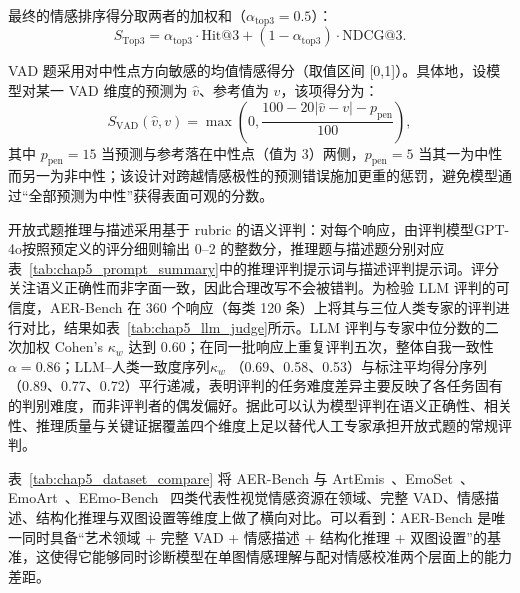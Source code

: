 最终的情感排序得分取两者的加权和（$\alpha_{\text{top3}}=0.5$）：
\begin{equation}
S_{\text{Top3}}=\alpha_{\text{top3}}\cdot\mathrm{Hit@3}+(1-\alpha_{\text{top3}})\cdot\mathrm{NDCG@3}.
\label{eq:chap5_stop3}
\end{equation}

VAD 题采用对中性点方向敏感的均值情感得分（取值区间 [0,1]）。具体地，设模型对某一 VAD 维度的预测为 $\hat{v}$、参考值为 $v$，该项得分为：
\begin{equation}
S_{\text{VAD}}(\hat{v},v)=\max\left(0,\frac{100-20|\hat{v}-v|-p_{\text{pen}}}{100}\right),
\label{eq:chap5_svad}
\end{equation}
其中 $p_{\text{pen}}=15$ 当预测与参考落在中性点（值为 3）两侧，$p_{\text{pen}}=5$ 当其一为中性而另一为非中性；该设计对跨越情感极性的预测错误施加更重的惩罚，避免模型通过“全部预测为中性”获得表面可观的分数。

开放式题推理与描述采用基于 rubric 的语义评判：对每个响应，由评判模型GPT-4o按照预定义的评分细则输出 0--2 的整数分，推理题与描述题分别对应表~\ref{tab:chap5_prompt_summary}中的推理评判提示词与描述评判提示词。评分关注语义正确性而非字面一致，因此合理改写不会被错判。为检验 LLM 评判的可信度，AER-Bench 在 360 个响应（每类 120 条）上将其与三位人类专家的评判进行对比，结果如表~\ref{tab:chap5_llm_judge}所示。LLM 评判与专家中位分数的二次加权 Cohen's $\kappa_w$ 达到 0.60；在同一批响应上重复评判五次，整体自我一致性 $\alpha=0.86$；LLM--人类一致度序列$\kappa_w$ （0.69、0.58、0.53）与标注平均得分序列（0.89、0.77、0.72）平行递减，表明评判的任务难度差异主要反映了各任务固有的判别难度，而非评判者的偶发偏好。据此可以认为模型评判在语义正确性、相关性、推理质量与关键证据覆盖四个维度上足以替代人工专家承担开放式题的常规评判。

表~\ref{tab:chap5_dataset_compare} 将 AER-Bench 与 ArtEmis~\cite{achlioptas2021artemis}、EmoSet~\cite{yang2023emoset}、EmoArt~\cite{emoart2025}、EEmo-Bench~\cite{eemobench2025} 四类代表性视觉情感资源在领域、完整 VAD、情感描述、结构化推理与双图设置等维度上做了横向对比。可以看到：AER-Bench 是唯一同时具备“艺术领域 + 完整 VAD + 情感描述 + 结构化推理 + 双图设置”的基准，这使得它能够同时诊断模型在单图情感理解与配对情感校准两个层面上的能力差距。

